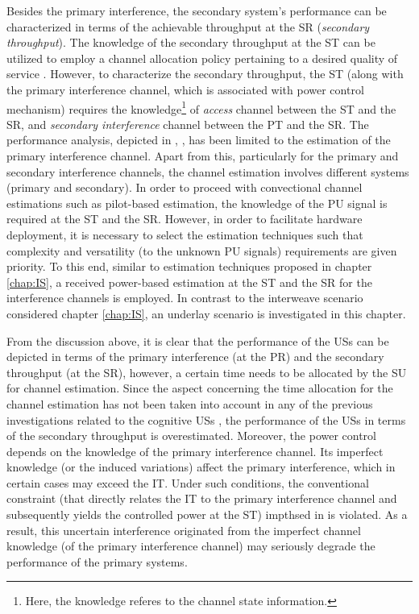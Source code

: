 Besides the primary interference, the secondary system's performance can be characterized in terms of the achievable throughput at the SR (\textit{secondary throughput}). The knowledge of the secondary throughput at the ST can be utilized to employ a channel allocation policy pertaining to a desired quality of service \cite{Lien10}. However, to characterize the secondary throughput, the ST (along with the primary interference channel, which is associated with power control mechanism) requires the knowledge\footnote{Here, the knowledge referes to the channel state information.} of \textit{access} channel between the ST and the SR, and \textit{secondary interference} channel between the PT and the SR. The performance analysis, depicted in , \cite{Musa09, Suraweera10, Kim12}, has been limited to the estimation of the primary interference channel. Apart from this, particularly for the primary and secondary interference channels, the channel estimation involves different systems (primary and secondary). In order to proceed with convectional channel estimations such as pilot-based estimation, the knowledge of the PU signal is required at the ST and the SR. However, in order to facilitate hardware deployment, it is necessary to select the estimation techniques such that complexity and versatility (to the unknown PU signals) requirements are given priority. To this end, similar to estimation techniques proposed in chapter \ref{chap:IS}, a received power-based estimation at the ST and the SR for the interference channels is employed. In contrast to the interweave scenario considered chapter \ref{chap:IS}, an underlay scenario is investigated in this chapter.   

From the discussion above, it is clear that the performance of the USs can be depicted in terms of the primary interference (at the PR) and the secondary throughput (at the SR), however, a certain time needs to be allocated by the SU for channel estimation. Since the aspect concerning the time allocation for the channel estimation has not been taken into account in any of the previous investigations related to the cognitive USs \cite{Musa09, Suraweera10, Kim12}, the performance of the USs in terms of the secondary throughput is overestimated. Moreover, the power control depends on the knowledge of the primary interference channel. Its imperfect knowledge (or the induced variations) affect the primary interference, which in certain cases may exceed the IT. Under such conditions, the conventional constraint (that directly relates the IT to the primary interference channel and subsequently yields the controlled power at the ST) impthsed in \cite{Xing07, Ghasemi07, Kang09} is violated. As a result, this uncertain interference originated from the imperfect channel knowledge (of the primary interference channel) may seriously degrade the performance of the primary systems. 

